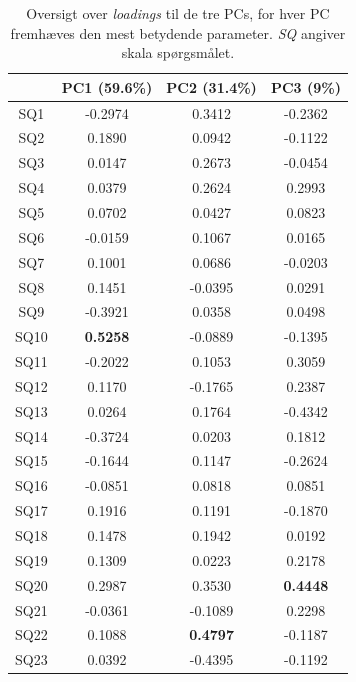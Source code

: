 \begin{table}[H]
\centering
\begin{tabular}{c|c|c|c}
    & PC1 (59.6\%)    & PC2 (31.4\%)    & PC3 (9\%)       \\ \hline
SQ1  & -0.2974         & 0.3412          & -0.2362         \\ \hline
SQ2  & 0.1890          & 0.0942          & -0.1122         \\ \hline
SQ3  & 0.0147          & 0.2673          & -0.0454         \\ \hline
SQ4  & 0.0379          & 0.2624          & 0.2993          \\ \hline
SQ5  & 0.0702          & 0.0427          & 0.0823          \\ \hline
SQ6  & -0.0159         & 0.1067          & 0.0165          \\ \hline
SQ7  & 0.1001          & 0.0686          & -0.0203         \\ \hline
SQ8  & 0.1451          & -0.0395         & 0.0291          \\ \hline
SQ9  & -0.3921         & 0.0358          & 0.0498          \\ \hline
SQ10 & \textbf{0.5258} & -0.0889         & -0.1395         \\ \hline
SQ11 & -0.2022         & 0.1053          & 0.3059          \\ \hline
SQ12 & 0.1170          & -0.1765         & 0.2387          \\ \hline
SQ13 & 0.0264          & 0.1764          & -0.4342         \\ \hline
SQ14 & -0.3724         & 0.0203          & 0.1812          \\ \hline
SQ15 & -0.1644         & 0.1147          & -0.2624         \\ \hline
SQ16 & -0.0851         & 0.0818          & 0.0851          \\ \hline
SQ17 & 0.1916          & 0.1191          & -0.1870         \\ \hline
SQ18 & 0.1478          & 0.1942          & 0.0192          \\ \hline
SQ19 & 0.1309          & 0.0223          & 0.2178          \\ \hline
SQ20 & 0.2987          & 0.3530          & \textbf{0.4448} \\ \hline
SQ21 & -0.0361         & -0.1089         & 0.2298          \\ \hline
SQ22 & 0.1088          & \textbf{0.4797} & -0.1187         \\ \hline
SQ23 & 0.0392          & -0.4395         & -0.1192        
\end{tabular}
\caption{Oversigt over \textit{loadings} til de tre PCs, for hver PC fremhæves den mest betydende parameter. \textit{SQ} angiver skala spørgsmålet.}
\label{tab:LoadingsIndgangsvinkel}
\end{table}
